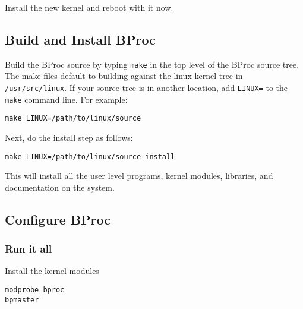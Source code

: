 Install the new kernel and reboot with it now.

\subsection*{Build and Install BProc}
Build the BProc source by typing \texttt{make} in the top level of the
BProc source tree.  The make files default to building against the
linux kernel tree in \texttt{/usr/src/linux}.  If your source tree is
in another location, add \texttt{LINUX=} to the \texttt{make} command
line.  For example:
\begin{verbatim}
make LINUX=/path/to/linux/source
\end{verbatim}
Next, do the install step as follows:
\begin{verbatim}
make LINUX=/path/to/linux/source install
\end{verbatim}

This will install all the user level programs, kernel modules,
libraries, and documentation on the system.

\subsection*{Configure BProc}


\subsubsection*{Run it all}
Install the kernel modules
\begin{verbatim}
modprobe bproc
bpmaster
\end{verbatim}



